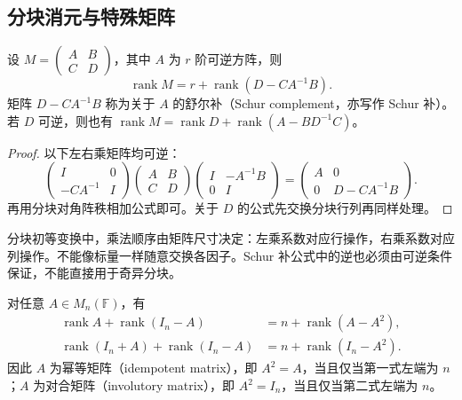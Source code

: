 \subsection{分块消元与特殊矩阵}

\begin{proposition}
\label{prop:laex-schur-rank}
设 $M=\begin{pmatrix}A&B\\C&D\end{pmatrix}$，其中 $A$ 为 $r$ 阶可逆方阵，则
\begin{equation}
\label{eq:laex-schur-rank}
\operatorname{rank}M=r+\operatorname{rank}(D-CA^{-1}B).
\end{equation}
矩阵 $D-CA^{-1}B$ 称为关于 $A$ 的舒尔补（Schur complement，亦写作 Schur 补）。若 $D$ 可逆，则也有 $\operatorname{rank}M=\operatorname{rank}D+\operatorname{rank}(A-BD^{-1}C)$。
\end{proposition}

\begin{proof}
以下左右乘矩阵均可逆：
\[
\begin{pmatrix}I&0\\-CA^{-1}&I\end{pmatrix}
\begin{pmatrix}A&B\\C&D\end{pmatrix}
\begin{pmatrix}I&-A^{-1}B\\0&I\end{pmatrix}
=\begin{pmatrix}A&0\\0&D-CA^{-1}B\end{pmatrix}.
\]
再用分块对角阵秩相加公式即可。关于 $D$ 的公式先交换分块行列再同样处理。
\end{proof}

分块初等变换中，乘法顺序由矩阵尺寸决定：左乘系数对应行操作，右乘系数对应列操作。不能像标量一样随意交换各因子。Schur 补公式中的逆也必须由可逆条件保证，不能直接用于奇异分块。

\begin{proposition}
\label{prop:laex-idempotent-involution-rank}
对任意 $A\in M_n(\mathbb F)$，有
\begin{align}
\operatorname{rank}A+\operatorname{rank}(I_n-A)
&=n+\operatorname{rank}(A-A^2),
\label{eq:laex-idempotent-rank}\\
\operatorname{rank}(I_n+A)+\operatorname{rank}(I_n-A)
&=n+\operatorname{rank}(I_n-A^2).
\label{eq:laex-involution-rank}
\end{align}
因此 $A$ 为幂等矩阵（idempotent matrix），即 $A^2=A$，当且仅当第一式左端为 $n$；$A$ 为对合矩阵（involutory matrix），即 $A^2=I_n$，当且仅当第二式左端为 $n$。
\end{proposition}

